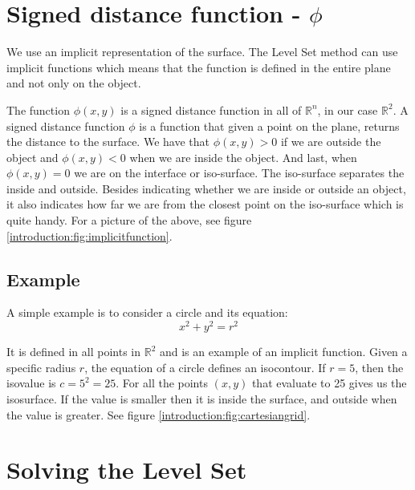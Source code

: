 \section*{Signed distance function - $\phi$}

We use an implicit representation of the surface. The Level Set method
can use implicit functions which means that the function is defined in
the entire plane and not only on the object.

The function $\phi(x,y)$ is a signed distance function in all of
$\mathbb{R}^{n}$, in our case $\mathbb{R}^{2}$. A signed distance
function $\phi$ is a function that given a point on the plane, returns
the distance to the surface. We have that $\phi(x,y) > 0$ if we are
outside the object and $\phi(x,y) < 0$ when we are inside the object.
And last, when $\phi(x,y) = 0$ we are on the interface or iso-surface.
The iso-surface separates the inside and outside.  Besides indicating
whether we are inside or outside an object, it also indicates how far
we are from the closest point on the iso-surface which is quite
handy. For a picture of the above, see figure
\vref{introduction:fig:implicitfunction}.



\subsection*{Example}

A simple example is to consider a circle and its equation:
\begin{equation*} x^{2} + y^{2} = r^{2}
\end{equation*}

It is defined in all points in $\mathbb{R}^{2}$ and is an example of
an implicit function. Given a specific radius $r$, the equation of a
circle defines an isocontour. If $r = 5$, then the isovalue is $c =
5^{2} = 25$. For all the points $(x,y)$ that evaluate to 25 gives us
the isosurface. If the value is smaller then it is inside the surface,
and outside when the value is greater. See figure
\vref{introduction:fig:cartesiangrid}.


\section*{Solving the Level Set}\label{sec:intro:solve} 

